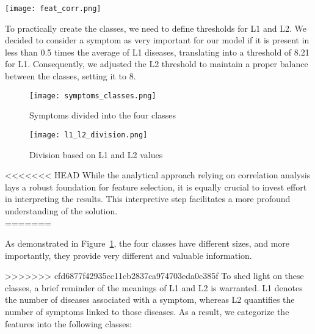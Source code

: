 \begin{figure*}[!t]
    \centering
    \texttt{[image: feat\_corr.png]}
    \caption{Correlation between features}
    \label{fig:feat_corr}
\end{figure*}

To practically create the classes, we need to define thresholds for L1 and L2. We decided to consider
a symptom as very important for our model if it is present in less than 0.5 times the average of L1 diseases,
translating into a threshold of 8.21 for L1. Consequently, we adjusted the L2 threshold to maintain a proper balance
between the classes, setting it to 8.

\begin{figure}[H]
    \centering
    \texttt{[image: symptoms\_classes.png]}
    \caption{Symptoms divided into the four classes}
    \label{fig:symptoms_classes}
\end{figure}

\begin{figure}[H]
    \centering
    \texttt{[image: l1\_l2\_division.png]}
    \caption{Division based on L1 and L2 values}
    \label{fig:l1_l2_division}
\end{figure}
\noindent
<<<<<<< HEAD
While the analytical approach relying on correlation analysis lays a robust foundation for feature selection,
it is equally crucial to invest effort in interpreting the results. This interpretive step facilitates a
more profound understanding of the solution.\\
=======


\noindent
As demonstrated in Figure~\ref{fig:symptoms_classes}, the four classes have different sizes, and more importantly,
they provide very different and valuable information.

>>>>>>> cfd6877f42935cc11cb2837ca974703eda0c385f
To shed light on these classes, a brief reminder of the meanings of L1 and L2 is warranted. L1 denotes the number
of diseases associated with a symptom, whereas L2 quantifies the number of symptoms linked to those diseases.
As a result, we categorize the features into the following classes:\\

